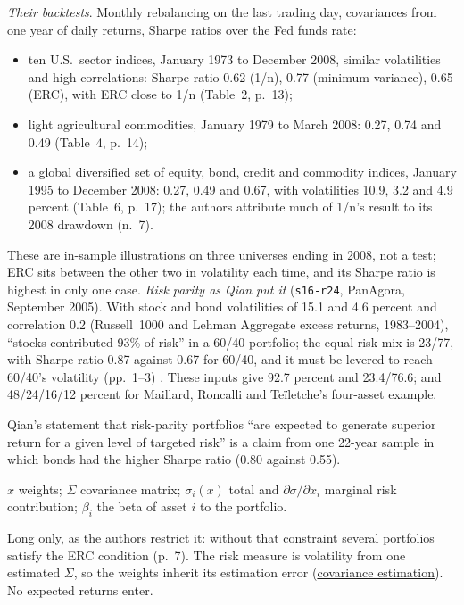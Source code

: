 \begin{qfmethod}
\emph{Their backtests}. Monthly rebalancing on the last trading day, covariances from one year of daily returns, Sharpe ratios over the Fed funds rate:
\begin{itemize}
\item ten U.S.\ sector indices, January 1973 to December 2008, similar volatilities and high correlations: Sharpe ratio 0.62 (1/n), 0.77 (minimum variance), 0.65 (ERC), with ERC close to 1/n (Table~2, p.~13);
\item light agricultural commodities, January 1979 to March 2008: 0.27, 0.74 and 0.49 (Table~4, p.~14);
\item a global diversified set of equity, bond, credit and commodity indices, January 1995 to December 2008: 0.27, 0.49 and 0.67, with volatilities 10.9, 3.2 and 4.9 percent (Table~6, p.~17); the authors attribute much of 1/n's result to its 2008 drawdown (n.~7).
\end{itemize}
These are in-sample illustrations on three universes ending in 2008, not a test; ERC sits between the other two in volatility each time, and its Sharpe ratio is highest in only one case. \emph{Risk parity as Qian put it} (\nolinkurl{s16-r24}, PanAgora, September 2005). With stock and bond volatilities of 15.1 and 4.6 percent and correlation 0.2 (Russell~1000 and Lehman Aggregate excess returns, 1983--2004), ``stocks contributed 93\% of risk'' in a 60/40 portfolio; the equal-risk mix is 23/77, with Sharpe ratio 0.87 against 0.67 for 60/40, and it must be levered to reach 60/40's volatility (pp.~1--3) \citep[pp.~1--3]{s16-r24}. These inputs give 92.7 percent and 23.4/76.6; and 48/24/16/12 percent for Maillard, Roncalli and Te\"iletche's four-asset example.

Qian's statement that risk-parity portfolios ``are expected to generate superior return for a given level of targeted risk'' is a claim from one 22-year sample in which bonds had the higher Sharpe ratio (0.80 against 0.55).

 $x$ weights; $\Sigma$ covariance matrix; $\sigma_i(x)$ total and $\partial\sigma/\partial x_i$ marginal risk contribution; $\beta_i$ the beta of asset $i$ to the portfolio.

 Long only, as the authors restrict it: without that constraint several portfolios satisfy the ERC condition (p.~7). The risk measure is volatility from one estimated $\Sigma$, so the weights inherit its estimation error (\hyperref[meth:portfolio-covariance-estimation]{covariance estimation}). No expected returns enter.


\end{qfmethod}
